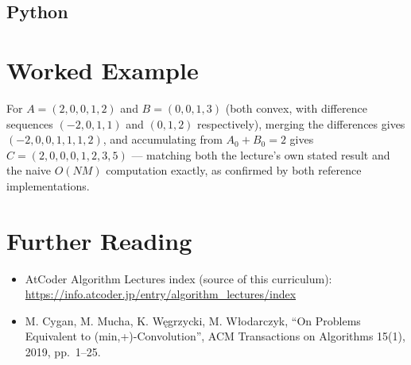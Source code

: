 \documentclass[11pt]{article}
\begin{document}
\subsection{Python}

\section{Worked Example}
\begin{examplebox}
For $A=(2,0,0,1,2)$ and $B=(0,0,1,3)$ (both convex, with difference
sequences $(-2,0,1,1)$ and $(0,1,2)$ respectively), merging the
differences gives $(-2,0,0,1,1,1,2)$, and accumulating from $A_0+B_0=2$
gives $C=(2,0,0,0,1,2,3,5)$ --- matching both the lecture's own stated
result and the naive $O(NM)$ computation exactly, as confirmed by both
reference implementations.
\end{examplebox}

\section{Further Reading}
\begin{itemize}[leftmargin=1.5em]
  \item AtCoder Algorithm Lectures index (source of this curriculum):
        \url{https://info.atcoder.jp/entry/algorithm_lectures/index}
  \item M. Cygan, M. Mucha, K. W\k{e}grzycki, M. W{\l}odarczyk, ``On
        Problems Equivalent to (min,+)-Convolution'', ACM Transactions
        on Algorithms 15(1), 2019, pp.\ 1--25.
\end{itemize}
\end{document}
